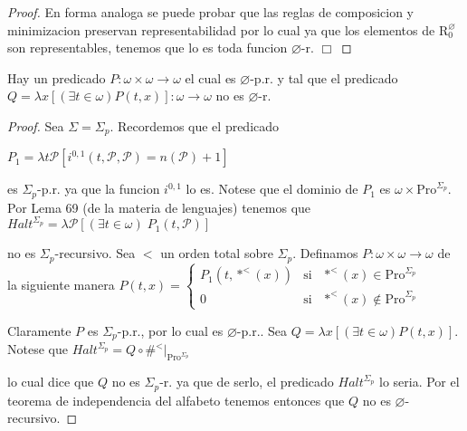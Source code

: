 \begin{proof}
    En forma analoga se puede probar que las reglas de composicion y minimizacion preservan representabilidad por lo cual ya que los elementos de \(\mathrm{R}_{0}^{\varnothing }\) son representables, tenemos que lo es toda funcion \(\varnothing \)-r. \(\Box\)
  \end{proof}

  \begin{lemma}
    Hay un predicado \(P:\omega \times \omega \rightarrow \omega \) el cual es \(\varnothing \)-p.r. y tal que el predicado \(Q=\lambda x \left[ (\exists t\in \omega )P(t,x)\right] :\omega \rightarrow \omega \) no es \(\varnothing \)-r.
  \end{lemma}
  \begin{proof}
    Sea \(\Sigma =\Sigma _{p}\). Recordemos que el predicado

    \(\displaystyle P_{1}=\lambda t\mathcal{P}\left[ i^{0,1}(t,\mathcal{P},\mathcal{P})=n( \mathcal{P})+1\right] \)

    es \(\Sigma _{p}\)-p.r. ya que la funcion \(i^{0,1}\) lo es. Notese que el dominio de \(P_{1}\) es \(\omega \times \mathrm{Pro}^{\Sigma _{p}}\). Por Lema 69 (de la materia de lenguajes) tenemos que
    \(\displaystyle Halt^{\Sigma _{p}}=\lambda \mathcal{P}\left[ (\exists t\in \omega )\;P_{1}(t, \mathcal{P})\right] \)

    no es \(\Sigma _{p}\)-recursivo. Sea \(< \) un orden total sobre \(\Sigma _{p}\). Definamos \(P:\omega \times \omega \rightarrow \omega \) de la siguiente manera
    \(\displaystyle P(t,x)=\left\{ \begin{array}{ccc} P_{1}(t,\ast ^{< }(x)) & \text{si} & \ast ^{< }(x)\in \mathrm{Pro}^{\Sigma _{p}} \\ 0 & \text{si} & \ast ^{< }(x)\notin \mathrm{Pro}^{\Sigma _{p}} \end{array} \right. \)

    Claramente \(P\) es \(\Sigma _{p}\)-p.r., por lo cual es \(\varnothing \)-p.r.. Sea \( Q=\lambda x\left[ (\exists t\in \omega )P(t,x)\right] .\) Notese que
    \(\displaystyle Halt^{\Sigma _{p}}=Q\circ \#^{< }\mathrm{\mid }_{\mathrm{Pro}^{\Sigma _{p}}} \)

    lo cual dice que \(Q\) no es \(\Sigma _{p}\)-r. ya que de serlo, el predicado \( Halt^{\Sigma _{p}}\) lo seria. Por el teorema de independencia del alfabeto tenemos entonces que \(Q\) no es \(\varnothing \)-recursivo.
  \end{proof}

